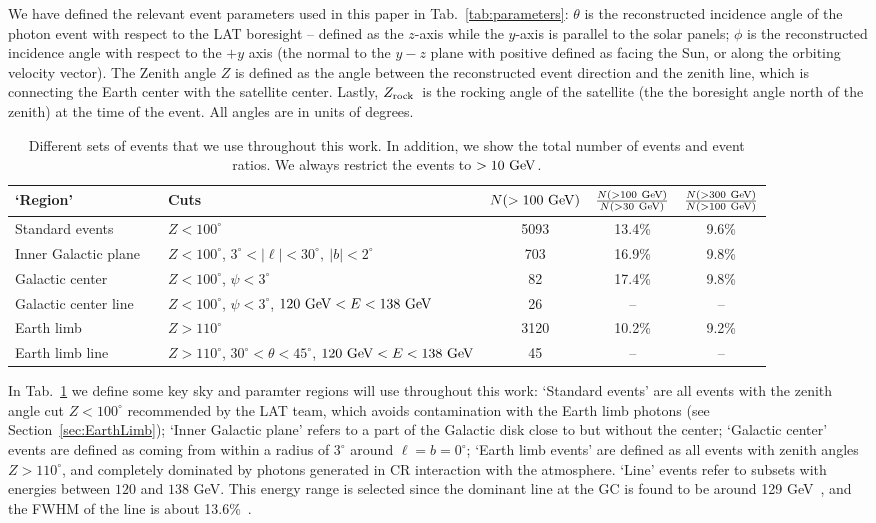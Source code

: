 \documentclass[aps,twocolumn,prd,superscriptaddress,showpacs,nofootinbib,fixfloat]{revtex4}
\newcommand{\GeV}{{\rm ~GeV}}
\newcommand{\zrock}{$Z_{\rm rock}$}
\begin{document}
We have defined the relevant event parameters used in this
paper in Tab.~\ref{tab:parameters}: $\theta$ is the
reconstructed incidence angle of the photon event with
respect to the LAT boresight -- defined as the $z$-axis
while the $y$-axis is parallel to the solar panels; $\phi$
is the reconstructed incidence angle with respect to the
$+y$ axis (the normal to the $y-z$ plane with positive
defined as facing the Sun, or along the orbiting velocity
vector). The Zenith angle $Z$ is defined as the angle
between the reconstructed event direction and the zenith
line, which is connecting the Earth center with the
satellite center.  Lastly, \zrock\ is the rocking angle of
the satellite (the the boresight angle north of the zenith)
at the time of the event.  All angles are in units of
degrees. 

\begin{table}
  \begin{tabular}{lllccc}
    \hline
    `Region' &&Cuts & $N(>100\GeV)$ & $\frac{N(>100\GeV)}{N(>30\GeV)}$ & $\frac{N(>300\GeV)}{N(>100\GeV)}$\\
    \hline
    Standard events      &  & $Z<100^\circ$ & 5093 & 13.4\% & 9.6\% \\
    Inner Galactic plane &  & $Z<100^\circ$, $3^\circ < |\ell| < 30^\circ,\ |b|<2^\circ$     & 703 & 16.9\% & 9.8\% \\
    Galactic center      &  & $Z<100^\circ$, $\psi<3^\circ$ & 82 & 17.4\% & 9.8\% \\
    Galactic center line &  & $Z<100^\circ$, $\psi<3^\circ$, $120\GeV<E<138\GeV$             & 26 & -- & -- \\
    Earth limb           &  & $Z>110^\circ$ & 3120 & 10.2\% & 9.2\% \\
    Earth limb line      &  & $Z>110^\circ$, $30^\circ<\theta<45^\circ$, $120\GeV<E<138\GeV$ & 45 & -- & -- \\ 
    \hline
  \end{tabular}
  \caption{Different sets of events that we use throughout this work. In
  addition, we show the total number of events and event ratios.
  We always restrict the events to $>10\GeV$.}
  \label{tab:regions}
\end{table}

In Tab.~\ref{tab:regions} we define some key sky and
paramter regions %
will use throughout this work: `Standard events' are all
events with the zenith angle cut $Z<100^\circ$ recommended
by the LAT team, which avoids contamination with the Earth
limb photons (see Section~\ref{sec:EarthLimb}); `Inner
Galactic plane' refers to a part of the Galactic disk close
to but without the center; `Galactic center' events are
defined as coming from within a radius of $3^\circ$ around
$\ell=b=0^\circ$; `Earth limb events' are defined as all
events with zenith angles $Z>110^\circ$, and completely
dominated by photons generated in CR interaction with the
atmosphere. `Line' events refer to subsets with energies
between $120$ and $138$ GeV. This energy range is selected
since the dominant line at the GC is found to be around 129
GeV~\cite{linepaper}, and the FWHM of the line is about
13.6\%~\cite{Weniger:2012}.
\end{document}
